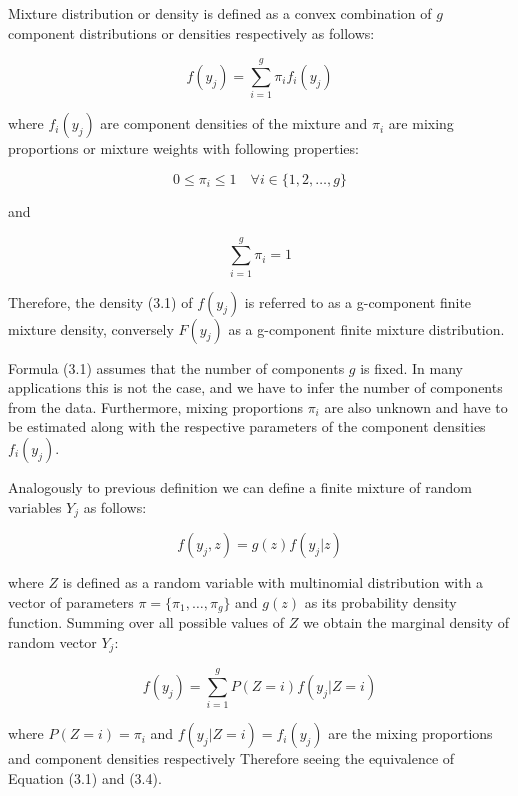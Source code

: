Mixture distribution or density is defined as a convex combination of $g$ component distributions or densities respectively 
as follows:

\begin{equation}
f(y_j) = \sum_{i=1}^{g} \pi_i f_i(y_j)
\end{equation}

where $f_i(y_j)$ are component densities of the mixture and $\pi_i$ are mixing proportions or mixture weights with following properties:

\begin{equation}
    0 \leq \pi_i \leq 1 \quad \forall i \in \{1,2,\ldots,g\}
\end{equation}

and

\begin{equation}
    \sum_{i=1}^{g} \pi_i = 1
\end{equation}

Therefore, the density (3.1) of $f(y_j)$ is referred to as a g-component finite mixture density, conversely $F(y_j)$ 
as a g-component finite mixture distribution. 

Formula (3.1) assumes that the number of components $g$ is fixed. In many applications this is not the case, and we have to infer 
the number of components from the data. Furthermore, mixing proportions $\pi_i$ are also unknown and have to be estimated along with 
the respective parameters of the component densities $f_i(y_j)$.

Analogously to previous definition we can define a finite mixture of random variables $Y_j$ as follows:

\begin{equation}
    f(y_j,z) =  g(z) f(y_j|z)
\end{equation}

where $Z$ is defined as a random variable with multinomial distribution with a vector of parameters $\pi = \{\pi_1,\ldots,\pi_g\}$ and $g(z)$ as its probability density function.
Summing over all possible values of $Z$ we obtain the marginal density of random vector $Y_j$:

\begin{equation}
    f(y_j) = \sum_{i=1}^{g} P(Z=i) f(y_j|Z=i)
\end{equation}
    
where $P(Z=i) = \pi_i$ and $f(y_j|Z=i) = f_i(y_j)$ are the mixing proportions and component densities respectively Therefore
seeing the equivalence of Equation (3.1) and (3.4).

